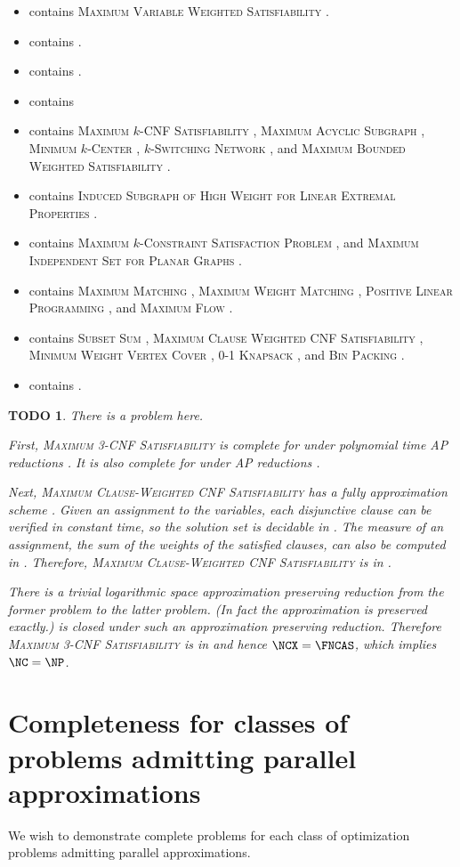 \documentclass[]{article}
\theoremstyle{plain}
\newtheorem{todo}{TODO}
\theoremstyle{definition}
\newcommand{\nncoproblems}{%
  \textsc{Maximum Variable Weighted Satisfiability} \cite[Theorem~3.1]{om87} \cite[Theorem~8.3]{acgkmp99}}
\newcommand{\expapxncoproblems}{}
\newcommand{\polyapxncoproblems}{}
\newcommand{\logapxncoproblems}{}
\newcommand{\apxncoproblems}{%
  \textsc{Maximum $k$-CNF Satisfiability} \cite[Theorem~8.6]{acgkmp99},
  \textsc{Maximum Acyclic Subgraph} \cite[Section~7.4]{dsst97},
  \textsc{Minimum $k$-Center} \cite[Section~7.4]{dsst97},
  \textsc{$k$-Switching Network} \cite[Section~7.4]{dsst97}, and
  \textsc{Maximum Bounded Weighted Satisfiability} \cite[Theorem~4]{sx95}}
\newcommand{\apxncopproblems}{%
  \textsc{Induced Subgraph of High Weight for Linear Extremal Properties} \cite{dsst97}}
\newcommand{\ncasproblems}{%
  \textsc{Maximum $k$-Constraint Satisfaction Problem} \cite[Corollary~13]{trevisan98}, and
  \textsc{Maximum Independent Set for Planar Graphs} \cite[Theorem 6.4.1]{dsst97}}
\newcommand{\ncaspproblems}{%
  \textsc{Maximum Matching} \cite[Theorem~5.2.1]{dsst97},
  \textsc{Maximum Weight Matching} \cite[Theorem~5.2.2]{dsst97},
  \textsc{Positive Linear Programming} \cite[Theorem~5.1.11]{dsst97} \cite{tx98}, and
  \textsc{Maximum Flow} \cite[Theorem~5.2.2]{dsst97}}
\newcommand{\fncasproblems}{%
  \textsc{Subset Sum} \cite[Theorem~4.1.4]{dsst97},
  \textsc{Maximum Clause Weighted CNF Satisfiability} \cite[Theorem~8]{trevisan98},
  \textsc{Minimum Weight Vertex Cover} \cite[Theorem~5.3.6]{dsst97},
  \textsc{0-1 Knapsack} \cite[Theorem~2]{mayr88}, and
  \textsc{Bin Packing} \cite[Theorem~3]{mayr88}}
\newcommand{\ncoproblems}{}
\begin{document}
\begin{itemize}
\item \NNCO{} contains \nncoproblems.
\item \expApxNCO{} contains \expapxncoproblems.
\item \polyApxNCO{} contains \polyapxncoproblems.
\item \logApxNCO{} contains \logapxncoproblems
\item \ApxNCO{} contains \apxncoproblems.
\item \ApxNCOp{} contains \apxncopproblems.
\item \NCAS{} contains \ncasproblems.
\item \NCASp{} contains \ncaspproblems.
\item \FNCAS{} contains \fncasproblems.
\item \NCO{} contains \ncoproblems.
\end{itemize}

\begin{todo}
  There is a problem here.

  First, \textsc{Maximum 3-CNF Satisfiability} is complete for \APX{} under polynomial time AP reductions \cite[Theorem~8.6]{acgkmp99}.
  It is also complete for \NCX{} under \NC{} AP reductions \cite{finkelstein13b}.

  Next, \textsc{Maximum Clause-Weighted CNF Satisfiability} has a fully \NC{} approximation scheme \cite[Theorem~8]{trevisan98}.
  Given an assignment to the variables, each disjunctive clause can be verified in constant time, so the solution set is decidable in \NC{}.
  The measure of an assignment, the sum of the weights of the satisfied clauses, can also be computed in \NC{}.
  Therefore, \textsc{Maximum Clause-Weighted CNF Satisfiability} is in \FNCAS.

  There is a trivial logarithmic space approximation preserving reduction from the former problem to the latter problem.
  (In fact the approximation is preserved exactly.)
  \FNCAS{} is closed under such an approximation preserving reduction.
  Therefore \textsc{Maximum 3-CNF Satisfiability} is in \FNCAS and hence $\NCX = \FNCAS$, which implies $\NC = \NP$.
\end{todo}

\section{Completeness for classes of problems admitting parallel approximations}

We wish to demonstrate complete problems for each class of optimization problems admitting parallel approximations.
\end{document}
